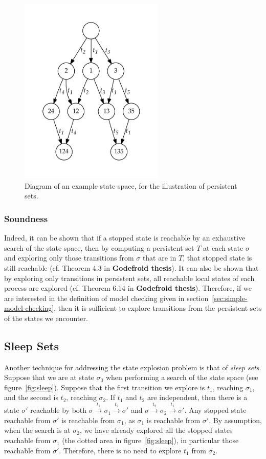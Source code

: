 \documentclass[12pt,a4paper,twoside,openright]{report}
\begin{document}
\begin{figure}
	\centering
	\includegraphics[height=9cm]{persistent1}
	\caption{Diagram of an example state space, for
		the illustration of persistent sets.}
	\label{fig:persistent}
\end{figure}

\subsubsection{Soundness}
Indeed, it can be shown that if a stopped state is reachable by an exhaustive
search of the state space, then by computing a persistent set $T$ at
each state $\sigma$ and exploring only those transitions from
$\sigma$ that are in $T$, that stopped state is still reachable
(cf. Theorem 4.3 in \textbf{Godefroid thesis}). It can also be shown
that by exploring only transitions in persistent sets, all reachable
local states of each process are explored (cf. Theorem 6.14 in
\textbf{Godefroid thesis}). Therefore, if we are interested in
the definition of model checking given in 
section~\ref{sec:simple-model-checking}, then it is sufficient
to explore transitions from the persistent sets of the states we
encounter.

\subsection{Sleep Sets}

Another technique for addressing the state explosion
problem is that of \emph{sleep sets}. Suppose that
we are at state $\sigma_0$ when performing a search
of the state space (see figure~\ref{fig:sleep}).
Suppose that the first transition
we explore is $t_1$, reaching $\sigma_1$,
and the second is $t_2$, reaching $\sigma_2$.
If $t_1$ and $t_2$ are independent, then there
is a state $\sigma'$ reachable by both
$\sigma \xrightarrow{t_1} \sigma_1
\xrightarrow{t_2} \sigma'$ and
$\sigma \xrightarrow{t_2} \sigma_2
\xrightarrow{t_1} \sigma'$.
Any stopped state reachable from $\sigma'$
is reachable from $\sigma_1$, as $\sigma_1$
is reachable from $\sigma'$. By assumption,
when the search is at $\sigma_2$, we have already
explored all the stopped states reachable from
$\sigma_1$ (the dotted area in figure~\ref{fig:sleep}),
in particular those reachable from
$\sigma'$. Therefore, there is no need to
explore $t_1$ from $\sigma_2$.
\end{document}
